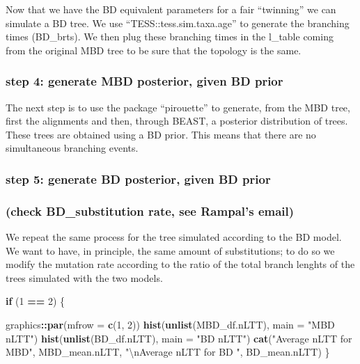\documentclass[]{article}
\newenvironment{Shaded}{\begin{snugshade}}{\end{snugshade}}
\newcommand{\KeywordTok}[1]{\textcolor[rgb]{0.13,0.29,0.53}{\textbf{#1}}}
\newcommand{\DataTypeTok}[1]{\textcolor[rgb]{0.13,0.29,0.53}{#1}}
\newcommand{\DecValTok}[1]{\textcolor[rgb]{0.00,0.00,0.81}{#1}}
\newcommand{\CharTok}[1]{\textcolor[rgb]{0.31,0.60,0.02}{#1}}
\newcommand{\StringTok}[1]{\textcolor[rgb]{0.31,0.60,0.02}{#1}}
\newcommand{\ControlFlowTok}[1]{\textcolor[rgb]{0.13,0.29,0.53}{\textbf{#1}}}
\newcommand{\OperatorTok}[1]{\textcolor[rgb]{0.81,0.36,0.00}{\textbf{#1}}}
\newcommand{\NormalTok}[1]{#1}
\begin{document}
Now that we have the BD equivalent parameters for a fair ``twinning'' we
can simulate a BD tree. We use ``TESS::tess.sim.taxa.age'' to generate
the branching times (BD\_brts). We then plug these branching times in
the l\_table coming from the original MBD tree to be sure that the
topology is the same.

\subsubsection{step 4: generate MBD posterior, given BD
prior}\label{step-4-generate-mbd-posterior-given-bd-prior}

The next step is to use the package ``pirouette'' to generate, from the
MBD tree, first the alignments and then, through BEAST, a posterior
distribution of trees. These trees are obtained using a BD prior. This
means that there are no simultaneous branching events.

\subsubsection{step 5: generate BD posterior, given BD
prior}\label{step-5-generate-bd-posterior-given-bd-prior}

\subsubsection{(check BD\_substitution rate, see Rampal's
email)}\label{check-bd_substitution-rate-see-rampals-email}

We repeat the same process for the tree simulated according to the BD
model. We want to have, in principle, the same amount of substitutions;
to do so we modify the mutation rate according to the ratio of the total
branch lenghts of the trees simulated with the two models.

\begin{Shaded}
\begin{Highlighting}[]
\ControlFlowTok{if}\NormalTok{ (}\DecValTok{1} \OperatorTok{==}\StringTok{ }\DecValTok{2}\NormalTok{) \{}
  
\NormalTok{  graphics}\OperatorTok{::}\KeywordTok{par}\NormalTok{(}\DataTypeTok{mfrow =} \KeywordTok{c}\NormalTok{(}\DecValTok{1}\NormalTok{, }\DecValTok{2}\NormalTok{))}
  \KeywordTok{hist}\NormalTok{(}\KeywordTok{unlist}\NormalTok{(MBD_df.nLTT), }\DataTypeTok{main =} \StringTok{"MBD nLTT"}\NormalTok{)}
  \KeywordTok{hist}\NormalTok{(}\KeywordTok{unlist}\NormalTok{(BD_df.nLTT), }\DataTypeTok{main =} \StringTok{"BD nLTT"}\NormalTok{)}
  \KeywordTok{cat}\NormalTok{(}\StringTok{"Average nLTT for MBD"}\NormalTok{, MBD_mean.nLTT, }\StringTok{"}\CharTok{\textbackslash{}n}\StringTok{Average nLTT for BD "}\NormalTok{, BD_mean.nLTT)}
\NormalTok{\}}
\end{Highlighting}
\end{Shaded}
\end{document}
